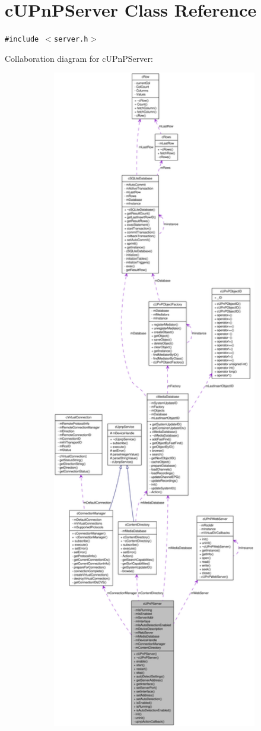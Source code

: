 \hypertarget{classcUPnPServer}{
\section{cUPnPServer Class Reference}
\label{classcUPnPServer}
}
{\tt \#include $<$server.h$>$}

Collaboration diagram for cUPnPServer:\nopagebreak
\begin{figure}[H]
\begin{center}
\leavevmode
\includegraphics[width=400pt]{classcUPnPServer__coll__graph}
\end{center}
\end{figure}
